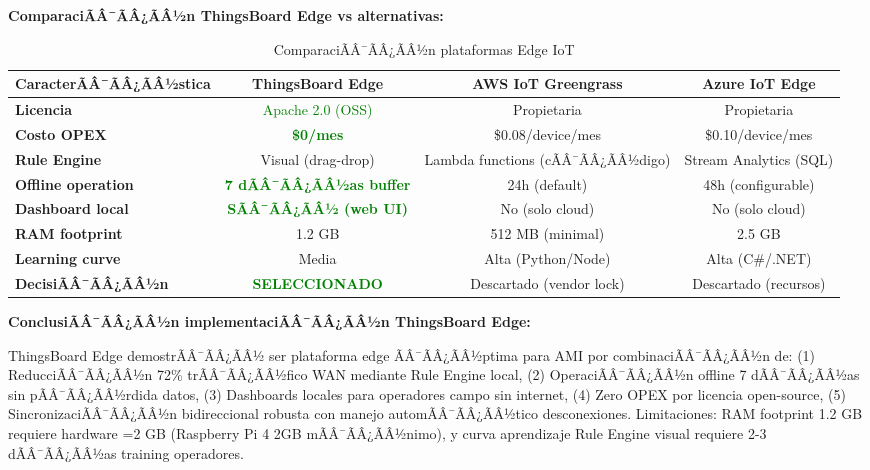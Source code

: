 \textbf{ComparaciÃÂ¯ÃÂ¿ÃÂ½n ThingsBoard Edge vs alternativas:}

\begin{table}[H]
\centering
\caption{ComparaciÃÂ¯ÃÂ¿ÃÂ½n plataformas Edge IoT}
\label{tab:impl-edge-comparison}
\small
\begin{tabular}{|l|c|c|c|}
\hline
\rowcolor{gray!20}
\textbf{CaracterÃÂ¯ÃÂ¿ÃÂ½stica} & \textbf{ThingsBoard Edge} & \textbf{AWS IoT Greengrass} & \textbf{Azure IoT Edge} \\
\hline
\textbf{Licencia} & \textcolor{green}{Apache 2.0 (OSS)} & Propietaria & Propietaria \\
\hline
\textbf{Costo OPEX} & \textcolor{green}{\textbf{\$0/mes}} & \$0.08/device/mes & \$0.10/device/mes \\
\hline
\textbf{Rule Engine} & Visual (drag-drop) & Lambda functions (cÃÂ¯ÃÂ¿ÃÂ½digo) & Stream Analytics (SQL) \\
\hline
\textbf{Offline operation} & \textcolor{green}{\textbf{7 dÃÂ¯ÃÂ¿ÃÂ½as buffer}} & 24h (default) & 48h (configurable) \\
\hline
\textbf{Dashboard local} & \textcolor{green}{\textbf{SÃÂ¯ÃÂ¿ÃÂ½ (web UI)}} & No (solo cloud) & No (solo cloud) \\
\hline
\textbf{RAM footprint} & 1.2 GB & 512 MB (minimal) & 2.5 GB \\
\hline
\textbf{Learning curve} & Media & Alta (Python/Node) & Alta (C\#/.NET) \\
\hline
\textbf{DecisiÃÂ¯ÃÂ¿ÃÂ½n} & \textcolor{green}{\textbf{SELECCIONADO}} & Descartado (vendor lock) & Descartado (recursos) \\
\hline
\end{tabular}
\end{table}

\textbf{ConclusiÃÂ¯ÃÂ¿ÃÂ½n implementaciÃÂ¯ÃÂ¿ÃÂ½n ThingsBoard Edge:}

ThingsBoard Edge demostrÃÂ¯ÃÂ¿ÃÂ½ ser plataforma edge ÃÂ¯ÃÂ¿ÃÂ½ptima para AMI por combinaciÃÂ¯ÃÂ¿ÃÂ½n de: (1) ReducciÃÂ¯ÃÂ¿ÃÂ½n 72\% trÃÂ¯ÃÂ¿ÃÂ½fico WAN mediante Rule Engine local, (2) OperaciÃÂ¯ÃÂ¿ÃÂ½n offline 7 dÃÂ¯ÃÂ¿ÃÂ½as sin pÃÂ¯ÃÂ¿ÃÂ½rdida datos, (3) Dashboards locales para operadores campo sin internet, (4) Zero OPEX por licencia open-source, (5) SincronizaciÃÂ¯ÃÂ¿ÃÂ½n bidireccional robusta con manejo automÃÂ¯ÃÂ¿ÃÂ½tico desconexiones. Limitaciones: RAM footprint 1.2 GB requiere hardware =2 GB (Raspberry Pi 4 2GB mÃÂ¯ÃÂ¿ÃÂ½nimo), y curva aprendizaje Rule Engine visual requiere 2-3 dÃÂ¯ÃÂ¿ÃÂ½as training operadores.

